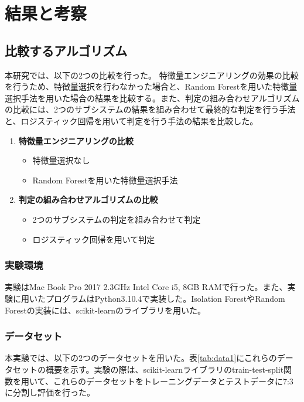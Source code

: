 \documentclass{css}
\begin{document}
\section{結果と考察}

\subsection{比較するアルゴリズム}

本研究では、以下の2つの比較を行った。
特徴量エンジニアリングの効果の比較を行うため、特徴量選択を行わなかった場合と、Random Forestを用いた特徴量選択手法を用いた場合の結果を比較する。また、判定の組み合わせアルゴリズムの比較には、2つのサブシステムの結果を組み合わせて最終的な判定を行う手法と、ロジスティック回帰を用いて判定を行う手法の結果を比較した。

\begin{enumerate}
    \item \textbf{特徴量エンジニアリングの比較}
        \begin{itemize}
            \item 特徴量選択なし
            \item Random Forestを用いた特徴量選択手法
        \end{itemize}
    \item \textbf{判定の組み合わせアルゴリズムの比較}
        \begin{itemize}
            \item 2つのサブシステムの判定を組み合わせて判定
            \item ロジスティック回帰を用いて判定
        \end{itemize}
\end{enumerate}

\subsubsection{実験環境}

実験はMac Book Pro 2017 2.3GHz Intel Core i5, 8GB RAMで行った。また、実験に用いたプログラムはPython3.10.4で実装した。Isolation ForestやRandom Forestの実装には、scikit-learnのライブラリを用いた\cite{scikit-learn}。

\subsubsection{データセット}
本実験では、以下の2つのデータセットを用いた。表\ref{tab:data1}にこれらのデータセットの概要を示す。実験の際は、scikit-learnライブラリのtrain-test-split関数を用いて、これらのデータセットをトレーニングデータとテストデータに7:3に分割し評価を行った。
\end{document}
